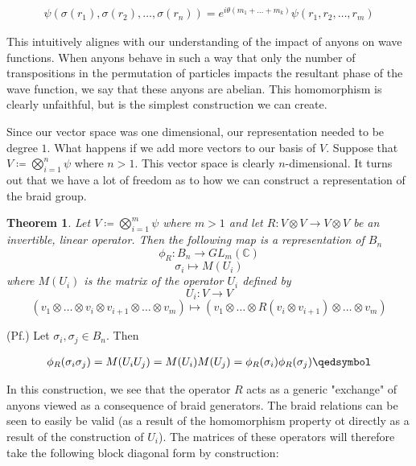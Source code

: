 \documentclass[10pt]{ucthesis}
\newcommand{\C}{\mathbb{C}}
\newtheorem{theorem}[definition]{Theorem}
\begin{document}
\begin{equation}
	\begin{aligned}
		\psi(\sigma(r_1),\sigma(r_2),\hdots,\sigma(r_n)) = e^{i\theta(m_1+\hdots+m_k)} \psi(r_1,r_2,\hdots,r_m)
	\end{aligned}
\end{equation}

This intuitively alignes with our understanding of the impact of anyons on wave functions. When anyons behave in such a way that only the number of transpositions in the permutation of particles impacts the resultant phase of the wave function, we say that these anyons are abelian. This homomorphism is clearly unfaithful, but is the simplest construction we can create.

Since our vector space was one dimensional, our representation needed to be degree $1$. What happens if we add more vectors to our basis of $V$. Suppose that $V \coloneq \bigotimes_{i=1}^n\psi$ where $n>1$. This vector space is clearly $n$-dimensional. It turns out that we have a lot of freedom as to how we can construct a representation of the braid group.

\begin{theorem}\cite{Riverside}
	Let $V \coloneq \bigotimes_{i=1}^m\psi$ where $m>1$ and let $R: V\otimes V \rightarrow V\otimes V $ be an invertible, linear operator. Then the following map is a representation of $B_n$
$$\phi_R:B_n\rightarrow GL_m(\C)$$
$$\sigma_i \mapsto M(U_i)$$
where $M(U_i)$ is the matrix of the operator $U_i$ defined by
$$U_i:V\rightarrow V$$
$$(v_1\otimes\hdots\otimes v_i\otimes v_{i+1}\otimes\hdots\otimes v_m)\mapsto (v_1\otimes\hdots\otimes R(v_i\otimes v_{i+1})\otimes\hdots\otimes v_m)$$
\end{theorem}

\noindent (Pf.) Let $\sigma_i,\sigma_j\in B_n$. Then

\begin{equation}
	\begin{aligned}
		\phi_R(\sigma_i\sigma_j) = M(U_iU_j) = M(U_i)M(U_j) =  \phi_R(\sigma_i)\phi_R(\sigma_j) \qedsymbol
	\end{aligned}
\end{equation}

In this construction, we see that the operator $R$ acts as a generic "exchange" of anyons viewed as a consequence of braid generators. The braid relations can be seen to easily be valid (as a result of the homomorphism property ot directly as a result of the construction of $U_i$). The matrices of these operators will therefore take the following block diagonal form by construction:
\end{document}
